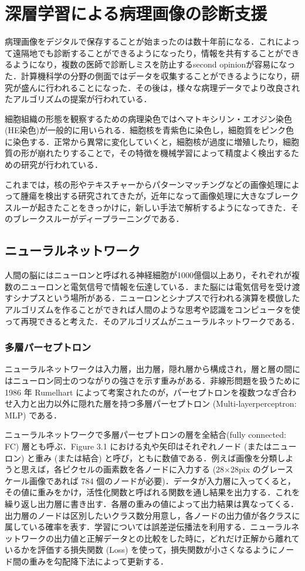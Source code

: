 \chapter{深層学習による病理画像の診断支援}
\label{chap_review}
病理画像をデジタルで保存することが始まったのは数十年前になる．これによって遠隔地でも診断することができるようになったり，情報を共有することができるようになり，複数の医師で診断しミスを防止するsecond opinionが容易になった．計算機科学の分野の側面ではデータを収集することができるようになり，研究が盛んに行われることになった．その後は，様々な病理データでより改良されたアルゴリズムの提案が行われている．

細胞組織の形態を観察するための病理染色ではヘマトキシリン・エオジン染色(HE染色)が一般的に用いられる．細胞核を青紫色に染色し，細胞質をピンク色に染色する．正常から異常に変化していくと，細胞核が過度に増殖したり，細胞質の形が崩れたりすることで，その特徴を機械学習によって精度よく検出するための研究が行われている．

これまでは，核の形やテキスチャーからパターンマッチングなどの画像処理によって腫瘍を検出する研究されてきたが，近年になって画像処理に大きなブレークスルーが起きたことをきっかけに，新しい手法で解析するようになってきた．そのブレークスルーがディープラーニングである．

\section{ニューラルネットワーク}
人間の脳にはニューロンと呼ばれる神経細胞が1000億個以上あり，それぞれが複数のニューロンと電気信号で情報を伝達している．また脳には電気信号を受け渡すシナプスという場所がある．ニューロンとシナプスで行われる演算を模倣したアルゴリズムを作ることができれば人間のような思考や認識をコンピュータを使って再現できると考えた．そのアルゴリズムがニューラルネットワークである．

\subsection*{多層パーセプトロン}
ニューラルネットワークは入力層，出力層，隠れ層から構成され，層と層の間にはニューロン同士のつながりの強さを示す重みがある．非線形問題を扱うために 1986 年 Rumelhart によって考案されたのが，パーセプトロンを複数つなぎ合わせ入力と出力以外に隠れた層を持つ多層パーセプトロン (Multi-layerperceptron: MLP) である．

ニューラルネットワークで多層パーセプトロンの層を全結合(fully connected: FC) 層とも呼ぶ．Figure 3.1 における丸や矢印はそれぞれノード (またはニューロン) と重み (または結合) と呼び，ともに数値である．例えば画像を分類しようと思えば，各ピクセルの画素数を各ノードに入力する (28×28pix のグレースケール画像であれば 784 個のノードが必要)．データが入力層に入ってくると，その値に重みをかけ，活性化関数と呼ばれる関数を通し結果を出力する．これを繰り返し出力層に書き出す．各層の重みの値によって出力結果は異なってくる．出力層のノードは区別したいクラス数分用意し，各ノードの出力値が各クラスに属している確率を表す．学習については誤差逆伝播法を利用する．ニューラルネットワークの出力値と正解データとの比較をした時に，どれだけ正解から離れているかを評価する損失関数 (Loss) を使って，損失関数が小さくなるようにノード間の重みを勾配降下法によって更新する．

